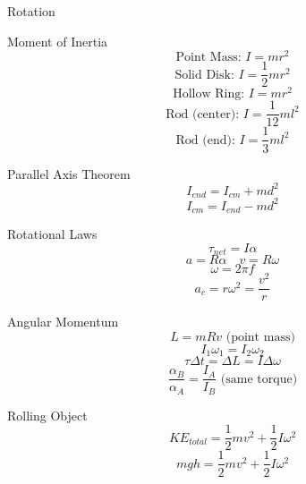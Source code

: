 Rotation

Moment of Inertia
$$\text{Point Mass: } I = mr^2$$
$$\text{Solid Disk: } I = \frac{1}{2}mr^2$$
$$\text{Hollow Ring: } I = mr^2$$
$$\text{Rod (center): } I = \frac{1}{12}ml^2$$
$$\text{Rod (end): } I = \frac{1}{3}ml^2$$

Parallel Axis Theorem
$$I_{end} = I_{cm} + md^2$$
$$I_{cm} = I_{end} - md^2$$

Rotational Laws
$$\tau_{net} = I\alpha$$
$$a = R\alpha \quad v = R\omega$$
$$\omega = 2\pi f$$
$$a_c = r\omega^2 = \frac{v^2}{r}$$

Angular Momentum
$$L = mRv \text{ (point mass)}$$
$$I_1\omega_1 = I_2\omega_2$$
$$\tau\Delta t = \Delta L = I\Delta\omega$$
$$\frac{\alpha_B}{\alpha_A} = \frac{I_A}{I_B} \text{ (same torque)}$$

Rolling Object
$$KE_{total} = \frac{1}{2}mv^2 + \frac{1}{2}I\omega^2$$
$$mgh = \frac{1}{2}mv^2 + \frac{1}{2}I\omega^2$$
